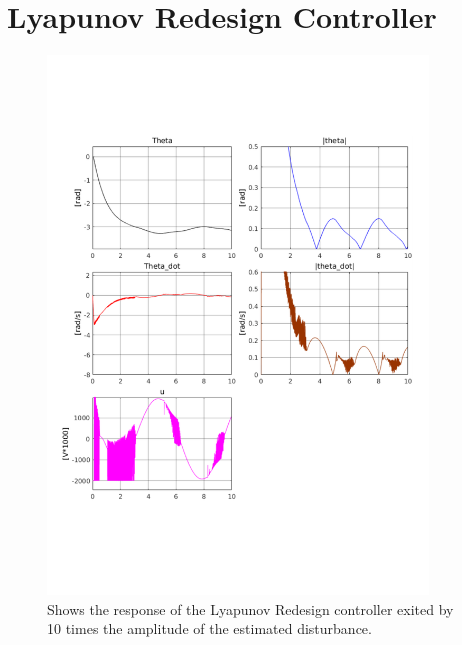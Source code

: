 \section{Lyapunov Redesign Controller} %
\label{sec:lyapunov_redesign_controller}
\begin{figure}[H]
        \centering
        \includegraphics[width=0.9\textwidth,trim=0.5cm 5cm 0.5cm 4cm, clip]{lyap_extreme_dis.pdf}
        \caption{Shows the response of the Lyapunov Redesign controller exited by 10 times the amplitude of the estimated disturbance.}
        \label{fig:lyap_extreme}
\end{figure}


